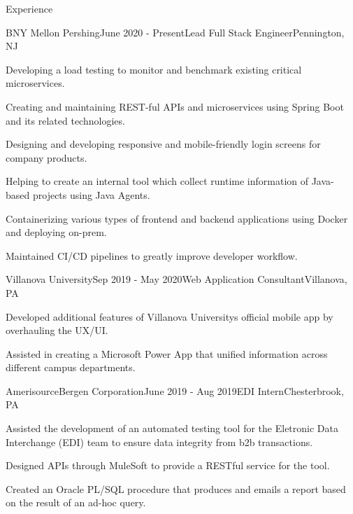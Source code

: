 \documentclass[
	11pt, %
]{resume} %
\begin{document}
\begin{rSection}{Experience}

	\begin{rSubsection}{BNY Mellon \textbar{} Pershing}{June 2020 - Present}{Lead Full Stack Engineer}{Pennington, NJ}
		\item Developing a load testing to monitor and benchmark existing critical microservices.
		\item Creating and maintaining REST-ful APIs and microservices using Spring Boot and its related technologies.
		\item Designing and developing responsive and mobile-friendly login screens for company products.
		\item Helping to create an internal tool which collect runtime information of Java-based projects using Java Agents.
		\item Containerizing various types of frontend and backend applications using Docker and deploying on-prem.
		\item Maintained CI/CD pipelines to greatly improve developer workflow.
	\end{rSubsection}


	\begin{rSubsection}{Villanova University}{Sep 2019 - May 2020}{Web Application Consultant}{Villanova, PA}
		\item Developed additional features of Villanova University\textquotesingle{}s official mobile app by overhauling the UX/UI.
		\item Assisted in creating a Microsoft Power App that unified information across different campus departments.
	\end{rSubsection}


	\begin{rSubsection}{AmerisourceBergen Corporation}{June 2019 - Aug 2019}{EDI Intern}{Chesterbrook, PA}
		\item Assisted the development of an automated testing tool for the Eletronic Data Interchange (EDI) team to ensure data integrity from b2b transactions.
		\item Designed APIs through MuleSoft to provide a RESTful service for the tool.
		\item Created an Oracle PL/SQL procedure that produces and emails a report based on the result of an ad-hoc query.
	\end{rSubsection}


\end{rSection}
\end{document}
